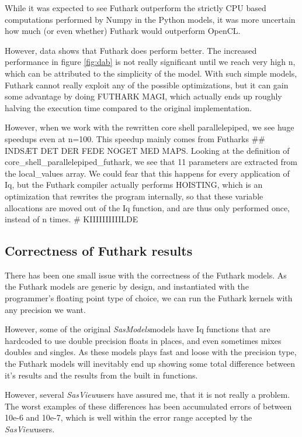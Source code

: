 \documentclass[11pt]{article}
\newcommand{\sasmodels}{\textit{SasModels}}
\newcommand{\sasview}{\textit{SasView}}
\begin{document}
\begin{mdframed}[
    frametitle={Why does Futhark perform faster than OpenCL?},
    nobreak=true]

While it was expected to see Futhark outperform the strictly CPU based 
computations performed by Numpy in the Python models, it was more uncertain
how much (or even whether) Futhark would outperform OpenCL.

However, data shows that Futhark does perform better. The increased performance 
in figure \ref{fig:dab} is not really significant until we reach very high n,
which can be attributed to the simplicity of the model. With such simple models,
Futhark cannot really exploit any of the possible optimizations, but it can gain
some advantage by doing FUTHARK MAGI, which actually ends up roughly halving the 
execution time compared to the original implementation.

However, when we work with the rewritten core shell parallelepiped, we see huge
speedups even at n=100. This speedup mainly comes from Futharks ## INDSÆT DET 
DER FEDE NOGET MED MAPS.
Looking at the definition of core_shell_parallelepiped_futhark, we see that 11
parameters are extracted from the local\_values array. We could fear that this
happens for every application of Iq, but the Futhark compiler actually performs
HOISTING, which is an optimization that rewrites the program internally, so that
these variable allocations are moved out of the Iq function, and are thus only
performed once, instead of n times.
# KIIIIIIIIIILDE
\end{mdframed}

\subsection{Correctness of Futhark results}
There has been one small issue with the correctness of the Futhark models.
As the Futhark models are generic by design, and instantiated with the 
programmer's floating point type of choice, we can run the Futhark kernels
with any precision we want.

However, some of the original \sasmodels models have Iq functions that are 
hardcoded to use double precision floats in places, and even sometimes mixes
doubles and singles. 
As these models plays fast and loose with the precision type, the Futhark models
will inevitably end up showing some total difference between it's results and 
the results from the built in functions.

However, several \sasview users have assured me, that it is not really a 
problem. The worst examples of these differences has been accumulated errors of
between 10e-6 and 10e-7, which is well within the error range accepted by 
the \sasview users.
\end{document}
